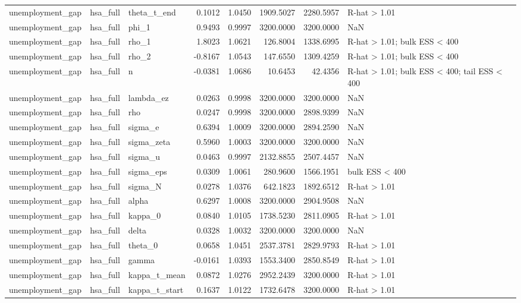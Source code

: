 \begin{tabular}{lllrrrrl}
unemployment\_gap & hsa\_full & theta\_t\_end & 0.1012 & 1.0450 & 1909.5027 & 2280.5957 & R-hat > 1.01 \\
unemployment\_gap & hsa\_full & phi\_1 & 0.9493 & 0.9997 & 3200.0000 & 3200.0000 & NaN \\
unemployment\_gap & hsa\_full & rho\_1 & 1.8023 & 1.0621 & 126.8004 & 1338.6995 & R-hat > 1.01; bulk ESS < 400 \\
unemployment\_gap & hsa\_full & rho\_2 & -0.8167 & 1.0543 & 147.6550 & 1309.4259 & R-hat > 1.01; bulk ESS < 400 \\
unemployment\_gap & hsa\_full & n & -0.0381 & 1.0686 & 10.6453 & 42.4356 & R-hat > 1.01; bulk ESS < 400; tail ESS < 400 \\
unemployment\_gap & hsa\_full & lambda\_ez & 0.0263 & 0.9998 & 3200.0000 & 3200.0000 & NaN \\
unemployment\_gap & hsa\_full & rho & 0.0247 & 0.9998 & 3200.0000 & 2898.9399 & NaN \\
unemployment\_gap & hsa\_full & sigma\_e & 0.6394 & 1.0009 & 3200.0000 & 2894.2590 & NaN \\
unemployment\_gap & hsa\_full & sigma\_zeta & 0.5960 & 1.0003 & 3200.0000 & 3200.0000 & NaN \\
unemployment\_gap & hsa\_full & sigma\_u & 0.0463 & 0.9997 & 2132.8855 & 2507.4457 & NaN \\
unemployment\_gap & hsa\_full & sigma\_eps & 0.0309 & 1.0061 & 280.9600 & 1566.1951 & bulk ESS < 400 \\
unemployment\_gap & hsa\_full & sigma\_N & 0.0278 & 1.0376 & 642.1823 & 1892.6512 & R-hat > 1.01 \\
unemployment\_gap & hsa\_full & alpha & 0.6297 & 1.0008 & 3200.0000 & 2904.9508 & NaN \\
unemployment\_gap & hsa\_full & kappa\_0 & 0.0840 & 1.0105 & 1738.5230 & 2811.0905 & R-hat > 1.01 \\
unemployment\_gap & hsa\_full & delta & 0.0328 & 1.0032 & 3200.0000 & 3200.0000 & NaN \\
unemployment\_gap & hsa\_full & theta\_0 & 0.0658 & 1.0451 & 2537.3781 & 2829.9793 & R-hat > 1.01 \\
unemployment\_gap & hsa\_full & gamma & -0.0161 & 1.0393 & 1553.3400 & 2850.8549 & R-hat > 1.01 \\
unemployment\_gap & hsa\_full & kappa\_t\_mean & 0.0872 & 1.0276 & 2952.2439 & 3200.0000 & R-hat > 1.01 \\
unemployment\_gap & hsa\_full & kappa\_t\_start & 0.1637 & 1.0122 & 1732.6478 & 3200.0000 & R-hat > 1.01 \\

\end{tabular}
